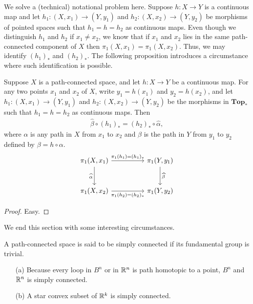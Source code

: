 We solve a (technical) notational problem here.
Suppose $h: X\rightarrow Y$ is a continuous map and let $h_1: (X, x_1)\rightarrow (Y, y_1)$ and $h_2: (X, x_2)\rightarrow (Y, y_2)$ be morphisms of pointed spaces such that $h_1=h=h_2$ as continuous maps.
Even though we distinguish $h_1$ and $h_2$ if $x_1\neq x_2$, we know that if $x_1$ and $x_2$ lies in the same path-connected component of $X$ then $\pi_1(X, x_1)=\pi_1(X, x_2)$.
Thus, we may identify $(h_1)_*$ and $(h_2)_*$.
The following proposition introduces a circumstance where such identification is possible.
\begin{prop}\label{Independence to base points}
    Suppose $X$ is a path-connected space, and let $h: X\rightarrow Y$ be a continuous map.
    For any two points $x_1$ and $x_2$ of $X$, write $y_1=h(x_1)$ and $y_2=h(x_2)$, and let $h_1: (X, x_1)\rightarrow(Y, y_1)$ and $h_2: (X, x_2)\rightarrow (Y, y_2)$ be the morphisms in $\textbf{Top}_*$ such that $h_1=h=h_2$ as continuous maps.
    Then
    \begin{align*}
        \widehat\beta \circ (h_1)_* = (h_2)_* \circ \widehat\alpha,
    \end{align*}
    where $\alpha$ is any path in $X$ from $x_1$ to $x_2$ and $\beta$ is the path in $Y$ from $y_1$ to $y_2$ defined by $\beta=h\circ\alpha$.
    \begin{equation*}
    \begin{tikzcd}[row sep=large, column sep=huge]
        \pi_1(X, x_1)\arrow[r, "\pi_1(h_1)=(h_1)_*"]
        \arrow[d, "\widehat\alpha"']
        &
        \pi_1(Y, y_1)
        \arrow[d, "\widehat\beta"]
        \\
        \pi_1(X, x_2)\arrow[r, "\pi_1(h_2)=(h_2)_*"']
        &
        \pi_1(Y, y_2)
    \end{tikzcd}
    \end{equation*}
\end{prop}
\begin{proof}
    Easy.
\end{proof}

We end this section with some interesting circumstances.
\begin{defi}
    A path-connected space is said to be simply connected if its fundamental group is trivial.
\end{defi}
\begin{exmp}
    \begin{enumerate}
        \item[(a)]
        {
            Because every loop in $B^n$ or in ${\mathbb{R}}^n$ is path homotopic to a point, $B^n$ and ${\mathbb{R}}^n$ is simply connected.
        }
        \item[(b)]
        {
            A star convex subset of ${\mathbb{R}}^k$ is simply connected.
        }
    \end{enumerate}
\end{exmp}


